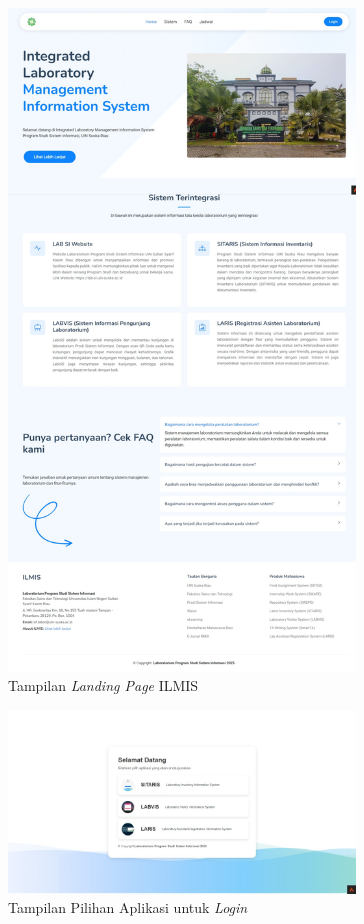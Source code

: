 \begin{figure}
	\centering
	\includegraphics[width=0.82\textwidth]{konten/gambar/hasil/landing-page.jpeg}
	\caption{Tampilan \textit{Landing Page} ILMIS}
	\label{fig:landing-page}
\end{figure}

\begin{figure}
	\centering
	\includegraphics[width=0.82\textwidth]{konten/gambar/hasil/pilih-aplikasi.jpeg}
	\caption{Tampilan Pilihan Aplikasi untuk \textit{Login}}
	\label{fig:pilih-login}
\end{figure}

